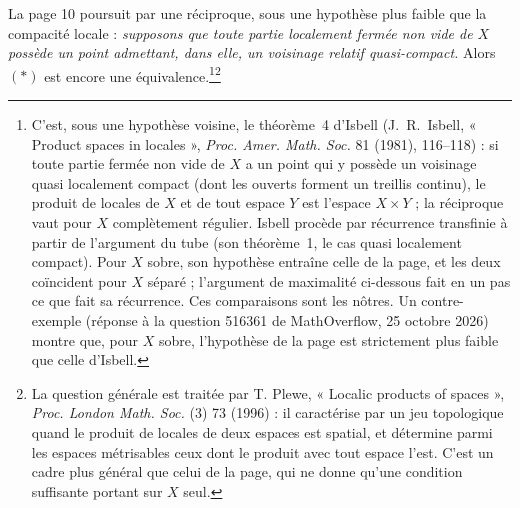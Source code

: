 \documentclass[11pt,a4paper]{article}
\begin{document}
La page 10 poursuit par une réciproque, sous une hypothèse plus faible que la
compacité locale : \emph{supposons que toute partie localement fermée non vide
de $X$ possède un point admettant, dans elle, un voisinage relatif
quasi-compact.} Alors $(*)$ est encore une équivalence.\footnote{C'est, sous une hypothèse voisine, le théorème~4 d'Isbell (J.~R.~Isbell, « Product spaces in locales », \emph{Proc. Amer. Math. Soc.} 81 (1981), 116--118) : si toute partie fermée non vide de $X$ a un point qui y possède un voisinage quasi localement compact (dont les ouverts forment un treillis continu), le produit de locales de $X$ et de tout espace $Y$ est l'espace $X \times Y$ ; la réciproque vaut pour $X$ complètement régulier. Isbell procède par récurrence transfinie à partir de l'argument du tube (son théorème~1, le cas quasi localement compact). Pour $X$ sobre, son hypothèse entraîne celle de la page, et les deux coïncident pour $X$ séparé ; l'argument de maximalité ci-dessous fait en un pas ce que fait sa récurrence. Ces comparaisons sont les nôtres. Un contre-exemple (réponse à la question 516361 de MathOverflow, 25 octobre 2026) montre que, pour $X$ sobre, l'hypothèse de la page est strictement plus faible que celle d'Isbell.}\footnote{La question générale est traitée par T. Plewe,
« Localic products of spaces », \emph{Proc. London Math. Soc.} (3) 73 (1996) :
il caractérise par un jeu topologique quand le produit de locales de deux
espaces est spatial, et détermine parmi les espaces métrisables ceux dont le
produit avec tout espace l'est. C'est un cadre plus général que celui de la
page, qui ne donne qu'une condition suffisante portant sur $X$ seul.}
\end{document}
